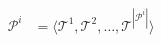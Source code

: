 \documentclass[preview]{standalone}
\begin{document}
\begin{align*}
\mathcal{P}^{i} &= \langle \mathcal{T}^{1}, \mathcal{T}^{2}, \dotsc, \mathcal{T}^{|\mathcal{P}^{i}|} \rangle \\
\end{align*}
\end{document}
